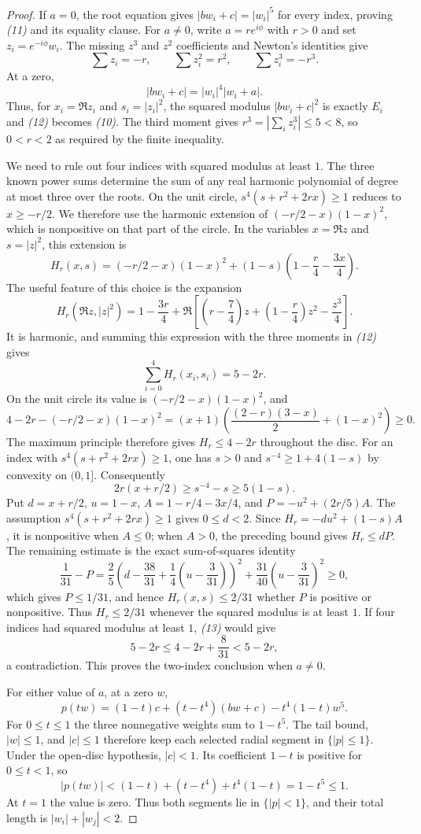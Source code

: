 \documentclass[11pt]{article}
\begin{document}
\begin{proof}
If $a=0$, the root equation gives $|bw_i+c|=|w_i|^5$ for every
index, proving \emph{(11)} and its equality clause. For $a\ne0$, write
$a=re^{i\phi}$ with $r>0$ and set $z_i=e^{-i\phi}w_i$.
The missing $z^3$ and $z^2$ coefficients and Newton's identities give
\[
 \sum z_i=-r,\qquad \sum z_i^2=r^2,\qquad
 \sum z_i^3=-r^3.                                 \tag{12}
\]
At a zero,
\[
 |bw_i+c|=|w_i|^4|w_i+a|.
\]
Thus, for $x_i=\Re z_i$ and $s_i=|z_i|^2$, the squared modulus $|bw_i+c|^2$ is exactly
$E_i$ and \emph{(12)} becomes \emph{(10)}. The third moment gives
$r^3=|\sum_i z_i^3|\le5<8$, so $0<r<2$ as required by the finite
inequality.

We need to rule out four indices with squared modulus at least $1$.
The three known power sums determine the sum of any real harmonic
polynomial of degree at most three over the roots. On the unit circle,
$s^4(s+r^2+2rx)\ge1$ reduces to $x\ge-r/2$. We therefore use the harmonic
extension of $(-r/2-x)(1-x)^2$, which is nonpositive on that part of the
circle. In the variables $x=\Re z$ and $s=|z|^2$, this extension is
\[
 H_r(x,s)=(-r/2-x)(1-x)^2
 +(1-s)\left(1-\frac r4-\frac{3x}{4}\right).
\]
The useful feature of this choice is the expansion
\[
 H_r(\Re z,|z|^2)
 =1-\frac{3r}{4}+
 \Re\!\left[\left(r-\frac74\right)z+
             \left(1-\frac r4\right)z^2-\frac{z^3}{4}\right].
\]
It is harmonic, and summing this expression with the three moments in
\emph{(12)} gives
\[
 \sum_{i=0}^4H_r(x_i,s_i)=5-2r.                  \tag{13}
\]
On the unit circle its value is $(-r/2-x)(1-x)^2$, and
\[
 4-2r-(-r/2-x)(1-x)^2
 =(x+1)\left(\frac{(2-r)(3-x)}2+(1-x)^2\right)\ge0.
\]
The maximum principle therefore gives $H_r\le4-2r$ throughout the disc.
For an index with $s^4(s+r^2+2rx)\ge1$, one has $s>0$ and
$s^{-4}\ge1+4(1-s)$ by convexity on $(0,1]$. Consequently
\[
 2r(x+r/2)\ge s^{-4}-s\ge5(1-s).
\]
Put $d=x+r/2$, $u=1-x$, $A=1-r/4-3x/4$, and
$P=-u^2+(2r/5)A$.  The assumption $s^4(s+r^2+2rx)\ge1$ gives $0\le d<2$.  Since
$H_r=-du^2+(1-s)A$, it is nonpositive when $A\le0$; when $A>0$,
the preceding bound gives $H_r\le dP$.  The remaining estimate is the exact
sum-of-squares identity
\[
 \frac1{31}-P
 =\frac25\left(d-\frac{38}{31}
               +\frac14(u-\frac3{31})\right)^2
  +\frac{31}{40}\left(u-\frac3{31}\right)^2\ge0,
\]
which gives $P\le1/31$, and hence $H_r(x,s)\le2/31$ whether $P$ is
positive or nonpositive.  Thus $H_r\le2/31$ whenever the squared modulus is at least $1$.
If four indices had squared modulus at least $1$, \emph{(13)} would give
\[
 5-2r\le4-2r+\frac8{31}<5-2r,
\]
a contradiction. This proves the two-index conclusion when $a\ne0$.

For either value of $a$, at a zero $w$,
\[
 p(tw)=(1-t)c+(t-t^4)(bw+c)-t^4(1-t)w^5.
\]
For $0\le t\le1$ the three nonnegative weights sum to $1-t^5$.
The tail bound, $|w|\le1$, and $|c|\le1$ therefore keep each selected
radial segment in $\{|p|\le1\}$. Under the open-disc hypothesis,
$|c|<1$. Its coefficient $1-t$ is positive for $0\le t<1$, so
\[
 |p(tw)|<(1-t)+(t-t^4)+t^4(1-t)=1-t^5\le1.
\]
At $t=1$ the value is zero. Thus both segments lie in $\{|p|<1\}$,
and their total length is $|w_i|+|w_j|<2$.
\end{proof}
\end{document}
